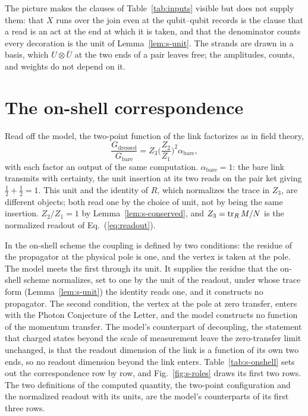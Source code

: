 The picture makes the clauses of Table~\ref{tab:inputs} visible but does not supply them: that $X$ runs over the join even at the qubit--qubit records is the clause that a read is an act at the end at which it is taken, and that the denominator counts every decoration is the unit of Lemma~\ref{lem:s-unit}. The strands are drawn in a basis, which $U\otimes\bar{U}$ at the two ends of a pair leaves free; the amplitudes, counts, and weights do not depend on it.

\section{The on-shell correspondence}
\label{sec:s-onshell}

Read off the model, the two-point function of the link factorizes as in field theory,
\begin{equation}
\frac{G_{\mathrm{dressed}}}{G_{\mathrm{bare}}}=Z_{3}\Big(\frac{Z_{2}}{Z_{1}}\Big)^{2}\alpha_{\mathrm{bare}},
\end{equation}
with each factor an output of the same computation. $\alpha_{\mathrm{bare}}=1$: the bare link transmits with certainty, the unit insertion at its two reads on the pair ket giving $\tfrac{1}{2}+\tfrac{1}{2}=1$. This unit and the identity of $R$, which normalizes the trace in $Z_{3}$, are different objects; both read one by the choice of unit, not by being the same insertion. $Z_{2}/Z_{1}=1$ by Lemma~\ref{lem:s-conserved}, and $Z_{3}=\operatorname{tr}_{R}M/N$ is the normalized readout of Eq.~(\ref{eq:readout}).

In the on-shell scheme the coupling is defined by two conditions: the residue of the propagator at the physical pole is one, and the vertex is taken at the pole. The model meets the first through its unit. It supplies the residue that the on-shell scheme normalizes, set to one by the unit of the readout, under whose trace form (Lemma~\ref{lem:s-unit}) the identity reads one, and it constructs no propagator. The second condition, the vertex at the pole at zero transfer, enters with the Photon Conjecture of the Letter, and the model constructs no function of the momentum transfer. The model's counterpart of decoupling, the statement that charged states beyond the scale of measurement leave the zero-transfer limit unchanged, is that the readout dimension of the link is a function of its own two ends, so no readout dimension beyond the link enters. Table~\ref{tab:s-onshell} sets out the correspondence row by row, and Fig.~\ref{fig:s-roles} draws its first two rows. The two definitions of the computed quantity, the two-point configuration and the normalized readout with its units, are the model's counterparts of its first three rows.

